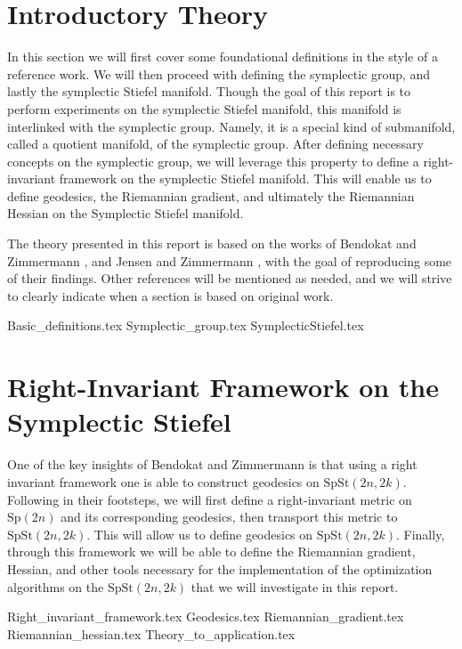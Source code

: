 \section{Introductory Theory}\label{sec:Introductory_theory}
In this section we will first cover some foundational definitions in the style of a reference work. We will then proceed with defining the symplectic group, and lastly the symplectic Stiefel manifold. Though the goal of this report is to perform experiments on the symplectic Stiefel manifold, this manifold is interlinked with the symplectic group. Namely, it is a special kind of submanifold, called a quotient manifold, of the symplectic group. After defining necessary concepts on the symplectic group, we will leverage this property to define a right-invariant framework on the symplectic Stiefel manifold. This will enable us to define geodesics, the Riemannian gradient, and ultimately the Riemannian Hessian on the Symplectic Stiefel manifold. 

The theory presented in this report is based on the works of Bendokat and Zimmermann \cite{BendokatZimmermann2021}, and Jensen and Zimmermann \cite{JensenZimmermann2024}, with the goal of reproducing some of their findings. Other references will be mentioned as needed, and we will strive to clearly indicate when a section is based on original work. 

{Basic_definitions.tex}
{Symplectic_group.tex}
{SymplecticStiefel.tex}

\section{Right-Invariant Framework on the Symplectic Stiefel}\label{sec:right_invariant_framework}
One of the key insights of Bendokat and Zimmermann \cite[p.~11]{BendokatZimmermann2021} is that using a right invariant framework one is able to construct geodesics on $\mathrm{SpSt}(2n, 2k)$. Following in their footsteps, we will first define a right-invariant metric on $\mathrm{Sp}(2n)$ and its corresponding geodesics, then transport this metric to $\mathrm{SpSt}(2n, 2k)$. This will allow us to define geodesics on $\mathrm{SpSt}(2n, 2k)$. Finally, through this framework we will be able to define the Riemannian gradient, Hessian, and other tools necessary for the implementation of the optimization algorithms on the $\mathrm{SpSt}(2n, 2k)$ that we will investigate in this report. 

{Right_invariant_framework.tex}
{Geodesics.tex}
{Riemannian_gradient.tex}
{Riemannian_hessian.tex}
{Theory_to_application.tex}
